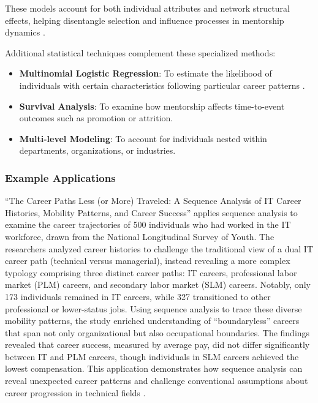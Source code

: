 \documentclass[main.tex]{subfiles}
\begin{document}
These models account for both individual attributes and network structural effects, helping disentangle selection and influence processes in mentorship dynamics \parencite{oxford2012siena}.

Additional statistical techniques complement these specialized methods:
\begin{itemize}
\item \textbf{Multinomial Logistic Regression}: To estimate the likelihood of individuals with certain characteristics following particular career patterns \parencite{pmc2015mapping}.
\item \textbf{Survival Analysis}: To examine how mentorship affects time-to-event outcomes such as promotion or attrition.
\item \textbf{Multi-level Modeling}: To account for individuals nested within departments, organizations, or industries.
\end{itemize}

\subsubsection{Example Applications}

``The Career Paths Less (or More) Traveled: A Sequence Analysis of IT Career Histories, Mobility Patterns, and Career Success'' applies sequence analysis to examine the career trajectories of 500 individuals who had worked in the IT workforce, drawn from the National Longitudinal Survey of Youth. The researchers analyzed career histories to challenge the traditional view of a dual IT career path (technical versus managerial), instead revealing a more complex typology comprising three distinct career paths: IT careers, professional labor market (PLM) careers, and secondary labor market (SLM) careers. Notably, only 173 individuals remained in IT careers, while 327 transitioned to other professional or lower-status jobs. Using sequence analysis to trace these diverse mobility patterns, the study enriched understanding of ``boundaryless'' careers that span not only organizational but also occupational boundaries. The findings revealed that career success, measured by average pay, did not differ significantly between IT and PLM careers, though individuals in SLM careers achieved the lowest compensation. This application demonstrates how sequence analysis can reveal unexpected career patterns and challenge conventional assumptions about career progression in technical fields \parencite{misq2008career}.
\end{document}
